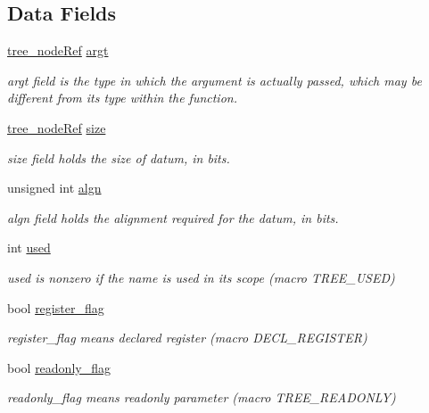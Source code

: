 \subsection*{Data Fields}
\begin{DoxyCompactItemize}
\item 
\hyperlink{tree__node_8hpp_a6ee377554d1c4871ad66a337eaa67fd5}{tree\+\_\+node\+Ref} \hyperlink{structparm__decl_aab7d1a10bdaa3b92d51371a51432ebed}{argt}
\begin{DoxyCompactList}\small\item\em argt field is the type in which the argument is actually passed, which may be different from its type within the function. \end{DoxyCompactList}\item 
\hyperlink{tree__node_8hpp_a6ee377554d1c4871ad66a337eaa67fd5}{tree\+\_\+node\+Ref} \hyperlink{structparm__decl_a57a75a7d074eab815fa211c843007d07}{size}
\begin{DoxyCompactList}\small\item\em size field holds the size of datum, in bits. \end{DoxyCompactList}\item 
unsigned int \hyperlink{structparm__decl_acca449ccbcb857450bcd279ea32d1299}{algn}
\begin{DoxyCompactList}\small\item\em algn field holds the alignment required for the datum, in bits. \end{DoxyCompactList}\item 
int \hyperlink{structparm__decl_a7b57ed0e055eafc34e895f3d4375316f}{used}
\begin{DoxyCompactList}\small\item\em used is nonzero if the name is used in its scope (macro T\+R\+E\+E\+\_\+\+U\+S\+ED) \end{DoxyCompactList}\item 
bool \hyperlink{structparm__decl_afa8d0ea86bc201652dbc25f9d5a29710}{register\+\_\+flag}
\begin{DoxyCompactList}\small\item\em register\+\_\+flag means declared \textquotesingle{}register\textquotesingle{} (macro D\+E\+C\+L\+\_\+\+R\+E\+G\+I\+S\+T\+ER) \end{DoxyCompactList}\item 
bool \hyperlink{structparm__decl_ae239b4279246ac83da186e10ff3914fd}{readonly\+\_\+flag}
\begin{DoxyCompactList}\small\item\em readonly\+\_\+flag means readonly parameter (macro T\+R\+E\+E\+\_\+\+R\+E\+A\+D\+O\+N\+LY) \end{DoxyCompactList}\item 

\end{DoxyCompactItemize}
